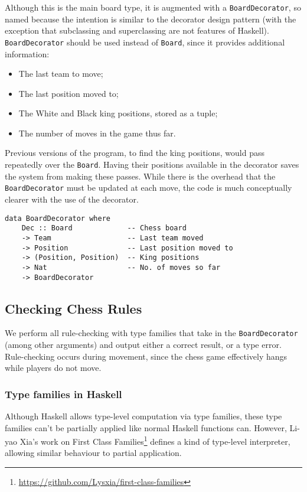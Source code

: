 \documentclass[12pt, a4paper]{scrartcl}
\begin{document}
Although this is the main board type, it is augmented with a \lstinline{BoardDecorator}, so named because the intention is similar to the decorator design pattern\cite{decorator} (with the exception that subclassing and superclassing are not features of Haskell). \lstinline{BoardDecorator} should be used instead of \lstinline{Board}, since it provides additional information:

\begin{itemize}
    \item The last team to move;
    \item The last position moved to;
    \item The White and Black king positions, stored as a tuple;
    \item The number of moves in the game thus far.
\end{itemize}

Previous versions of the program, to find the king positions, would pass repeatedly over the \lstinline{Board}. Having their positions available in the decorator saves the system from making these passes. While there is the overhead that the \lstinline{BoardDecorator} must be updated at each move, the code is much conceptually clearer with the use of the decorator.

\begin{lstlisting}
data BoardDecorator where
    Dec :: Board             -- Chess board
    -> Team                  -- Last team moved
    -> Position              -- Last position moved to
    -> (Position, Position)  -- King positions
    -> Nat                   -- No. of moves so far
    -> BoardDecorator
\end{lstlisting}

\subsection{Checking Chess Rules}

We perform all rule-checking with type families that take in the \lstinline{BoardDecorator} (among other arguments) and output either a correct result, or a type error. Rule-checking occurs during movement, since the chess game effectively hangs while players do not move.

\subsubsection{Type families in Haskell}

Although Haskell allows type-level computation via type families, these type families can't be partially applied like normal Haskell functions can. However, Li-yao Xia's work on First Class Families\footnote{\url{https://github.com/Lysxia/first-class-families}} defines a kind of type-level interpreter, allowing similar behaviour to partial application.
\end{document}
